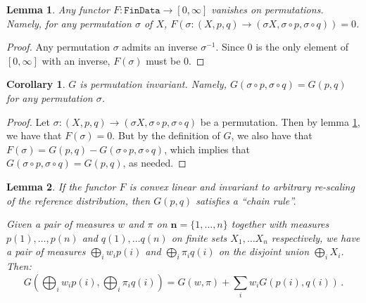 \documentclass{article}
\newtheorem{lemma}{Lemma}
\newtheorem{corollary}{Corollary}
\begin{document}
\begin{lemma} \label{vanishes_on_permutations}
    Any functor $F:\texttt{FinData}\rightarrow [0, \infty]$ vanishes on permutations. Namely, for any permutation $\sigma$ of $X$, $F(\sigma: (X, p, q) \rightarrow (\sigma X, \sigma \circ p, \sigma \circ q)) = 0$.
\end{lemma}
\begin{proof}
    Any permutation $\sigma$ admits an inverse $\sigma^{-1}$. Since $0$ is the only element of $[0, \infty]$ with an inverse, $F(\sigma)$ must be $0$.
\end{proof}
\begin{corollary}
    $G$ is permutation invariant. Namely, $G(\sigma\circ p, \sigma\circ q) = G(p, q)$ for any permutation $\sigma$.
\end{corollary}
\begin{proof}
    Let $\sigma: (X, p, q) \rightarrow (\sigma X, \sigma \circ p, \sigma \circ q)$ be a permutation. Then by lemma \ref{vanishes_on_permutations}, we have that $F(\sigma) = 0$. But by the definition of $G$, we also have that $F(\sigma) = G(p, q) - G(\sigma \circ p, \sigma \circ q)$, which implies that $G(\sigma \circ p, \sigma \circ q) = G(p, q)$, as needed.
\end{proof}

\begin{lemma}
    If the functor $F$ is convex linear and invariant to arbitrary re-scaling of the reference distribution, then $G(p, q)$ satisfies a ``chain rule''.
    
    Given a pair of measures $w$ and $\pi$ on $\mathbf{n} = \{{1, \ldots, n}\}$ together with measures $p(1), \ldots, p(n)$ and $q(1), \ldots q(n)$ on finite sets $X_1, \ldots X_n$ respectively, we have a pair of measures $\bigoplus_i w_i p(i)$ and $\bigoplus_i \pi_i q(i)$ on the disjoint union $\bigoplus_i X_i$. Then:
    \begin{equation} \label{chainrule}
        G\left(\bigoplus_i w_i p(i), \bigoplus_i \pi_i q(i)\right) = G(w, \pi) + \sum_i w_i G(p(i), q(i))\,.
    \end{equation}
\end{lemma}
\end{document}
